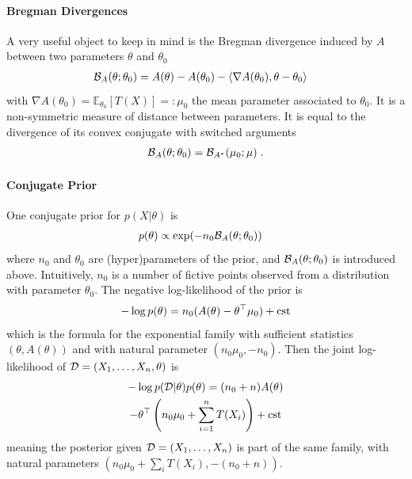 \documentclass[twoside]{article}
\newcommand*{\expect}[2][]{\ensuremath{\mathbb{E}_{#1} \left[ #2 \right] }} %
\newcommand{\logpart}{A}
\newcommand{\bregman}{\cB_\logpart}
\newcommand{\bregmanconj}{\cB_{\logpart^*}}
\newcommand{\natp}{\theta}
\newcommand{\meanp}{\mu}
\begin{document}
\paragraph{Bregman Divergences}
A very useful object to keep in mind is the Bregman divergence induced by $\logpart$ between two parameters $\natp$ and $\natp_0$
\begin{align}
    \bregman (\natp ; \natp_0)
    & = \logpart(\natp) - \logpart(\natp_0) 
    - \langle \nabla \logpart(\natp_0)  , \natp - \natp_0 \rangle
\end{align}
with $\nabla \logpart(\natp_0) = \expect[\natp_0]{T(X)} =: \meanp_0$ the mean parameter associated to $\natp_0$. 
It is a non-symmetric measure of distance between parameters.
It is equal to the divergence of its convex conjugate with switched arguments
\begin{align}
	\bregman (\natp ; \natp_0)
    = \bregmanconj ( \meanp_0 ; \meanp) \; .
\end{align}

\paragraph{Conjugate Prior}
One conjugate prior \citep{agarwal2010geometric} for $p(X|\natp)$ is
\begin{align}
    p(\natp) &\propto \exp( - n_0 \bregman(\natp ; \natp_0) )
\end{align}
where $n_0$ and $\natp_0$ are (hyper)parameters of the prior, and $\bregman(\natp ; \natp_0)$ is introduced above.
Intuitively, $n_0$ is a number of fictive points observed from a distribution with parameter $\natp_0$.
The negative log-likelihood of the prior is
\begin{align*}
    -\log p(\natp) = n_0 (\logpart(\natp)  - \natp^\top \meanp_0 ) + \cst
\end{align*}
which is the formula for the exponential family with sufficient statistics $(\natp ,\logpart(\natp))$ and with natural parameter $(n_0 \mu_0, -n_0)$.
Then the joint log-likelihood of $\cD =(X_1,\dots,X_n,\natp)$ is
\begin{multline}
    -\log p(\cD|\natp)p(\natp) 
    = (n_0+n) \logpart (\natp) \\
    - \theta^\top \left(n_0 \meanp_0 + \sum_{i=1}^n T(X_i) \right) + \cst
    \label{eq:joint_likelihood}
\end{multline}
meaning the posterior given ${\mathcal D}=(X_1,\dots, X_n)$ is part of the same family, with natural parameters $(n_0 \mu_0 + \sum_i T(X_i) , -(n_0 + n))$.
\end{document}
